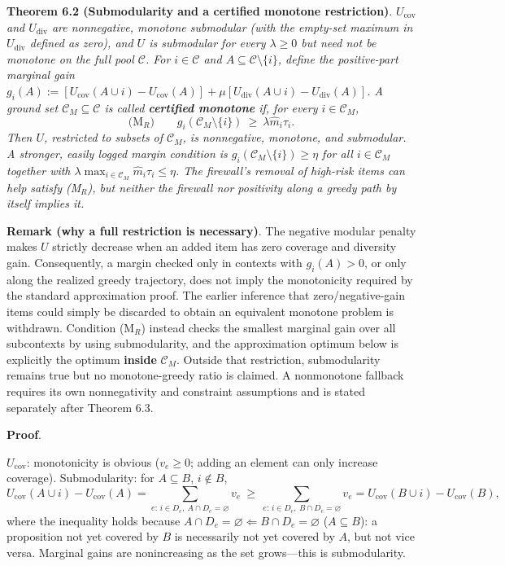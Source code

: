 \documentclass[
  11pt]{article}
\begin{document}
\textbf{Theorem 6.2 (Submodularity and a certified monotone
restriction)}. \emph{\(U_{\mathrm{cov}}\) and \(U_{\mathrm{div}}\) are
nonnegative, monotone submodular (with the empty-set maximum in
\(U_{\mathrm{div}}\) defined as zero), and \(U\) is submodular for every
\(\lambda\ge0\) but need not be monotone on the full pool
\(\mathcal C\). For \(i\in\mathcal C\) and
\(A\subseteq\mathcal C\setminus\{i\}\), define the positive-part
marginal gain
\(g_i(A):=[U_{\mathrm{cov}}(A\cup i)-U_{\mathrm{cov}}(A)]+\mu[U_{\mathrm{div}}(A\cup i)-U_{\mathrm{div}}(A)]\).
A ground set \(\mathcal C_M\subseteq\mathcal C\) is called
\textbf{certified monotone} if, for every \(i\in\mathcal C_M\),}
\[\text{(M$_R$)}\qquad g_i(\mathcal C_M\setminus\{i\})\ \ge\ \lambda\hat m_i\tau_i.\]
\emph{Then \(U\), restricted to subsets of \(\mathcal C_M\), is
nonnegative, monotone, and submodular. A stronger, easily logged margin
condition is \(g_i(\mathcal C_M\setminus\{i\})\ge\eta\) for all
\(i\in\mathcal C_M\) together with
\(\lambda\max_{i\in\mathcal C_M}\hat m_i\tau_i\le\eta\). The firewall's
removal of high-risk items can help satisfy (M\(_R\)), but neither the
firewall nor positivity along a greedy path by itself implies it.}

\textbf{Remark (why a full restriction is necessary)}. The negative
modular penalty makes \(U\) strictly decrease when an added item has
zero coverage and diversity gain. Consequently, a margin checked only in
contexts with \(g_i(A)>0\), or only along the realized greedy
trajectory, does not imply the monotonicity required by the standard
approximation proof. The earlier inference that zero/negative-gain items
could simply be discarded to obtain an equivalent monotone problem is
withdrawn. Condition (M\(_R\)) instead checks the smallest marginal gain
over all subcontexts by using submodularity, and the approximation
optimum below is explicitly the optimum \textbf{inside}
\(\mathcal C_M\). Outside that restriction, submodularity remains true
but no monotone-greedy ratio is claimed. A nonmonotone fallback requires
its own nonnegativity and constraint assumptions and is stated
separately after Theorem 6.3.

\textbf{Proof}.

\emph{\(U_{\mathrm{cov}}\)}: monotonicity is obvious (\(v_e \ge 0\);
adding an element can only increase coverage). Submodularity: for
\(A \subseteq B\), \(i \notin B\),
\[U_{\mathrm{cov}}(A \cup i) - U_{\mathrm{cov}}(A) = \sum_{e:\, i \in D_e,\ A \cap D_e = \varnothing} v_e \ \ge\ \sum_{e:\, i \in D_e,\ B \cap D_e = \varnothing} v_e = U_{\mathrm{cov}}(B \cup i) - U_{\mathrm{cov}}(B),\]
where the inequality holds because
\(A \cap D_e = \varnothing \Leftarrow B \cap D_e = \varnothing\)
(\(A \subseteq B\)): a proposition not yet covered by \(B\) is
necessarily not yet covered by \(A\), but not vice versa. Marginal gains
are nonincreasing as the set grows---this is submodularity.
\end{document}
